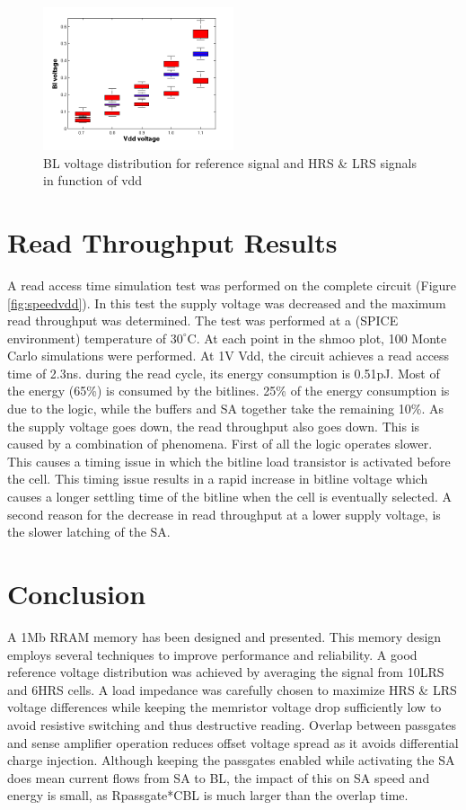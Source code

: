 \documentclass[journal]{IEEEtran}
\begin{document}
\begin{figure}[h!t]
  \centering
  \includegraphics[width=0.5\textwidth]{../fig/hfdst-final-vddbl.png}
  \caption{BL voltage distribution for reference signal and HRS \& LRS signals in function of vdd}
  \label{fig:vblvdd}
\end{figure}

\section{Read Throughput Results}\label{final}
A read access time simulation test was performed on the complete circuit (Figure \ref{fig:speedvdd}). In this test the supply voltage was decreased and the maximum read throughput was determined. The test was performed at a (SPICE environment) temperature of $30^{\circ}\mathrm{C}$. At each point in the shmoo plot, 100 Monte Carlo simulations were performed. At 1V Vdd, the circuit achieves a read access time of 2.3ns. during the read cycle, its energy consumption is 0.51pJ. Most of the energy (65\%) is consumed by the bitlines. 25\% of the energy consumption is due to the logic, while the buffers and SA together take the remaining 10\%. As the supply voltage goes down, the read throughput also goes down. This is caused by a combination of phenomena. First of all the logic operates slower. This causes a timing issue in which the bitline load transistor is activated before the cell. This timing issue results in a rapid increase in bitline voltage which causes a longer settling time of the bitline when the cell is eventually selected. A second reason for the decrease in read throughput at a lower supply voltage, is the slower latching of the SA.






\section{Conclusion}
A 1Mb RRAM memory has been designed and presented. This memory design employs several techniques to improve performance and reliability. A good reference voltage distribution was achieved by averaging the signal from 10LRS and 6HRS cells. A load impedance was carefully chosen to maximize HRS \& LRS voltage differences while keeping the memristor voltage drop sufficiently low to avoid resistive switching and thus destructive reading. Overlap between passgates and sense amplifier operation reduces offset voltage spread as it avoids differential charge injection. Although keeping the passgates enabled while activating the SA does mean current flows from SA to BL, the impact of this on SA speed and energy is small, as Rpassgate*CBL is much larger than the overlap time.


{}

\end{document}
